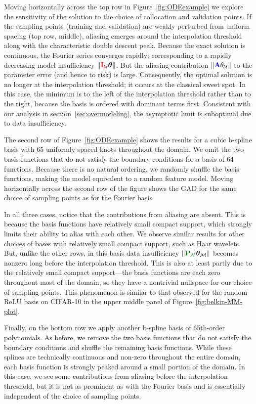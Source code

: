 \documentclass[twocolumn,aps,prx,superscriptaddress,10pt]{revtex4-2}
\newcommand{\0}{\bm{0}}
\newcommand{\btheta}{\boldsymbol{\theta}}
\newcommand{\M}{\mathcal{M}} %
\newcommand{\K}{\mathcal{N}} %
\newcommand{\U}{\mathcal{U}} %
\newcommand{\bbA}{{\color{blue}{\mathbf{A}}}}  %
\newcommand{\bbIU}{{\color{red}{\bbI_{\U}}}}  %
\newcommand{\bbPN}{{\color{Green}{\mathbf{P}_{\K}}}} %
\newcommand{\bbI}{\mathbf{I}}
\begin{document}
Moving horizontally across the top row in Figure~\ref{fig:ODEexample} we explore the sensitivity of the solution to the choice of collocation and validation points.
If the sampling points (training and validation) are weakly perturbed from uniform spacing (top row, middle), aliasing  emerges around the interpolation threshold along with the characteristic double descent peak. 
Because the exact solution is continuous, the Fourier series converges rapidly; corresponding to a rapidly decreasing model insufficiency $\|\bbIU\btheta\|$.
But the aliasing contribution $\Vert \bbA \theta_\U\Vert$ to the parameter error (and hence to risk) is large.
Consequently, the optimal solution is no longer at the interpolation threshold; it occurs at the classical sweet spot.
In this case, the minimum is to the left of the interpolation threshold rather than to the right, because the basis is ordered with dominant terms first.
Consistent with our analysis in section~\ref{sec:overmodeling}, the asymptotic limit is suboptimal due to data insufficiency.

The second row of Figure~\ref{fig:ODEexample} shows the results for a cubic b-spline basis with 65 uniformly spaced knots throughout the domain.
We omit the two basis functions that do not satisfy the boundary conditions for a basis of 64 functions.  
Because there is no natural ordering, we randomly shuffle the basis functions, making the model equivalent to a random feature model.
Moving horizontally across the second row of the figure shows the GAD for the same choice of sampling points as for the Fourier basis.

In all three cases, notice that the contributions from aliasing are absent.
This is because the basis functions have relatively small compact support, which strongly limits their ability to alias with each other.
We observe similar results for other choices of bases with relatively small compact support, such as Haar wavelets.
But, unlike the other rows, in this basis data insufficiency $\|\bbPN \btheta_\M\|$ becomes nonzero long before the interpolation threshold.
This is also at least partly due to the relatively small compact support---the basis functions are each zero throughout most of the domain, so they have a nontrivial nullspace for our choice of sampling points.
This  phenomenon is similar to that observed for the random ReLU basis on CIFAR-10 in the upper middle panel of Figure~\ref{fig:belkin-MM-plot}.

Finally, on the bottom row we apply another b-spline basis of 65th-order polynomials.
As before, we remove the two basis functions that do not satisfy the boundary conditions and shuffle the remaining basis functions.
While these splines are technically continuous and non-zero throughout the entire domain, each basis function is strongly peaked around a small portion of the domain.
In this case, we see some contributions from aliasing before the interpolation threshold, but it is not as prominent as with the Fourier basis and is essentially independent of the choice of sampling points.  
\end{document}
